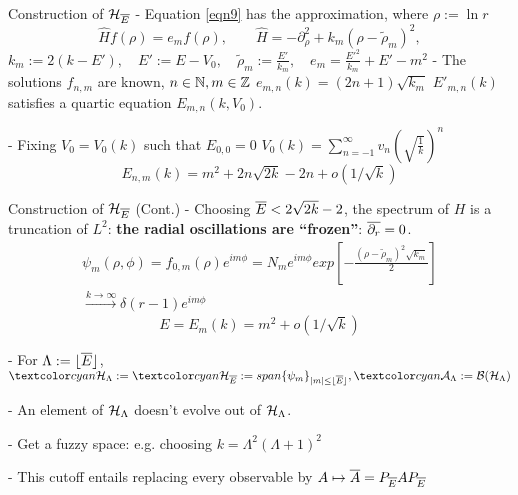 \begin{frame}{Construction of $\mathcal H_{\overline{E}}$} %
    - Equation \eqref{eqn9} has the approximation, where $\rho := \ln r$
    \begin{equation}
        \label{harmonic2D}
        \hat H f(\rho) = e_m f(\rho), \qquad
        \hat H = - \partial_\rho^2 + k_m(\rho - \tilde \rho_m)^2,
    \end{equation} $
        k_m := 2(k - E'), \quad
        E' := E - V_0, \quad
        \tilde \rho_m := \frac{E'}{k_m}, \quad
        e_m = \frac{E'^2}{k_m} + E' - m^2
    $
    - The solutions $f_{n,m}$ are known, $n \in \mathbb N, m \in \mathbb Z$ \then $e_{m, n}(k) = (2n+1)\sqrt{k_m}$ \then $E'_{m,n}(k)$ satisfies a quartic equation \then $E_{m,n}(k, V_0)$.
    
    - Fixing $V_0 = V_0(k)$ such that $E_{0, 0} = 0$ \then $V_0(k) = %
    \sum_{n = -1}^\infty v_n \left( \sqrt{\frac{1}{k}} \right)^n$ \then
    \begin{equation}
        E_{n, m}(k) = m^2 + 2n\sqrt{2k} - 2n + o(1/\sqrt{k})
    \end{equation}
    
\end{frame}

\begin{frame}{Construction of $\mathcal H_{\overline{E}}$ (Cont.)}
    - Choosing $\overline{E} < 2 \sqrt{2k} - 2$, the spectrum of $H$ is a truncation of $L^2$: \textbf{the radial oscillations are ``frozen''}: $\overline{\partial_r} = 0$.
    \begin{multline*}
        \psi_m(\rho, \phi) = f_{0, m}(\rho) e^{im\phi} = N_m e^{im\phi}exp{\left[ -\frac{(\rho - \tilde \rho_m)^2 \sqrt{k_m}}{2} \right]} \\\xrightarrow{k \to \infty} \delta(r-1)e^{i m \phi}
    \end{multline*}
    \begin{equation}
        E = E_m(k) = m^2 + o(1/\sqrt{k})
    \end{equation}
    
    - For $\Lambda := \lfloor \overline{E} \rfloor$, 
        $\lbtext{\hcal_{\Lambda}}:= \lbtext{\hcal_{\cut E}} := span\{\psi_m\}_{|m| \leq 
    \lfloor \cut E \rfloor} ,
    \lbtext{\acal_\Lambda} := \mathcal B(\hcal_\Lambda)$
    
    - %
    An element of $\mathcal H_\Lambda$ doesn't evolve out of $\mathcal H_\Lambda$.
    
    - Get a fuzzy space: e.g. choosing $k = \Lambda^2(\Lambda+1)^2$ %
    
    - This cutoff entails replacing every observable by $A \mapsto \overline{A} = P_{\overline{E}} A P_{\overline{E}}$%
\end{frame}

